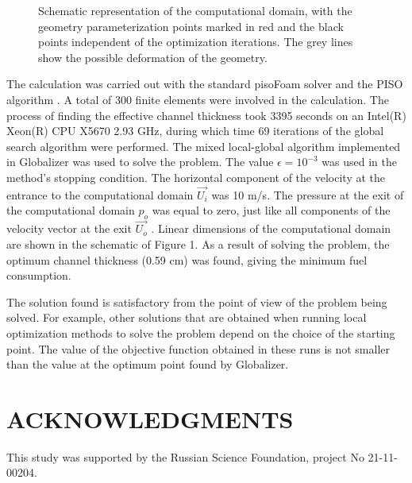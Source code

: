 \documentclass{aip-cp}
\begin{document}
\begin{figure}
\caption{Schematic representation of the computational domain, with the geometry parameterization points marked in red and the black points independent of the optimization iterations. The grey lines show the possible deformation of the geometry.}
\label{fig}
\end{figure}



The calculation was carried out with the standard pisoFoam solver and the PISO algorithm \cite{Issa1986_2,Issa1986_1}.
A total of 300 finite elements were involved in the calculation. The process of finding the effective channel thickness took 3395 seconds on an Intel(R) Xeon(R) CPU X5670 2.93 GHz, during which time 69 iterations of the global search algorithm were performed. 
The mixed local-global algorithm \cite{Barkalov2010} implemented in Globalizer \cite{globalizerSystem} was used to solve the problem. The value $\epsilon = 10^{-3}$ was used in the method’s stopping condition.
The horizontal component of the velocity at the entrance to the computational domain $\vec{U_i}$  was 10 m/s. The pressure at the exit of the computational domain $p_o$ was equal to zero, just like all components of the velocity vector at the exit $\vec{U_o}$ . Linear dimensions of the computational domain are shown in the schematic of Figure 1. As a result of solving the problem, the optimum channel thickness (0.59 cm) was found, giving the minimum fuel consumption.

The solution found is satisfactory from the point of view of the problem being solved. For example, other solutions that are obtained when running local optimization methods to solve the problem depend on the choice of the starting point. The value of the objective function obtained  in these runs is not smaller than the value at the optimum point found by Globalizer.

\section{ACKNOWLEDGMENTS}
This study was supported by the Russian Science Foundation, project No 21-11-00204.




%
%
\end{document}
